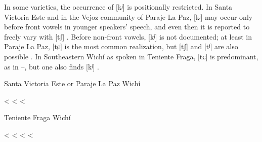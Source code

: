 In some varieties, the occurrence of [kʲ] is positionally restricted. In Santa Victoria Este and in the Vejoz community of Paraje La Paz, [kʲ] may occur only before front vowels in younger speakers’ speech, and even then it is reported to freely vary with [tʃ] \recind [tɕ] . Before non-front vowels, [kʲ] is not documented; at least in Paraje La Paz, [tɕ] is the most common realization, but [tʃ] and [tʲ] are also possible \citep{AFG067}. In Southeastern Wichí as spoken in Teniente Fraga, [tɕ] is predominant, as in –, but one also finds [kʲ] .

\ea\label{wi:kj:sve-plp}
Santa Victoria Este or Paraje La Paz Wichí \citep[160]{AFG-SS-09}\\
    \begin{xlist}
        \ex {} \recind {} < 
        \ex {} \recind {} < 
        \ex {} \recind {} < 
    \end{xlist}
\z

\ea\label{wi:kj:tf}
Teniente Fraga Wichí \citep[130–132]{MC09}\\
    \begin{xlist}
        \ex {} <  \label{wi:kj:tf1}
        \ex {} \recind {} < 
        \ex {} <  \label{wi:kj:tf3}
        \ex {} <  \label{wi:kj:tf4}
    \end{xlist}
\z
{}

